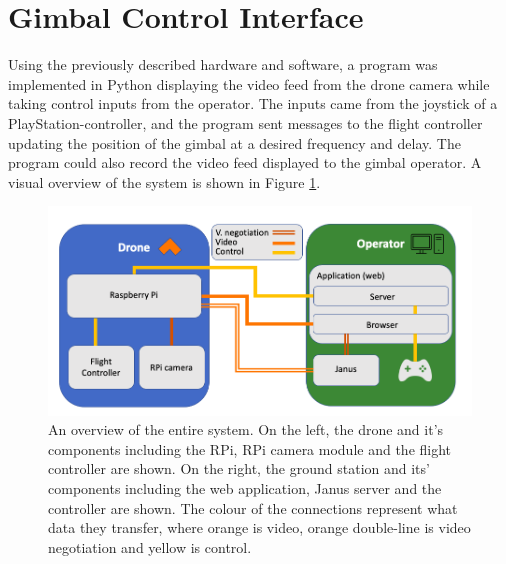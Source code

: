 \documentclass[nofilelist]{cslthse-msc}
\begin{document}
\section{Gimbal Control Interface}
Using the previously described hardware and software, a program was implemented in Python displaying the video feed from the drone camera while taking control inputs from the operator. The inputs came from the joystick of a PlayStation-controller, and the program sent messages to the flight controller updating the position of the gimbal at a desired frequency and delay. The program could also record the video feed displayed to the gimbal operator. A visual overview of the system is shown in Figure \ref{fig:system-overview}.
\begin{figure}[!hbt]
   \centering
   \includegraphics[scale=0.5]{images/system-overview.png} 
   \caption{An overview of the entire system. On the left, the drone and it's components including the RPi, RPi camera module and the flight controller are shown. On the right, the ground station and its' components including the web application, Janus server and the controller are shown. The colour of the connections represent what data they transfer, where orange is video, orange double-line is video negotiation and yellow is control.}
   \label{fig:system-overview}
\end{figure}
\end{document}
